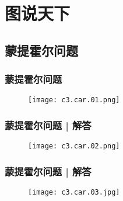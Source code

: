 \section{图说天下}
\subsection{蒙提霍尔问题}
\begin{frame}
  \frametitle{蒙提霍尔问题}
  \begin{figure}
    \centering
    \texttt{[image: c3.car.01.png]}
  \end{figure}
\end{frame}

\begin{frame}
  \frametitle{蒙提霍尔问题 | 解答}
  \begin{figure}
    \centering
    \texttt{[image: c3.car.02.png]}
  \end{figure}
\end{frame}
\begin{frame}
  \frametitle{蒙提霍尔问题 | 解答}
  \begin{figure}
    \centering
    \texttt{[image: c3.car.03.jpg]}
  \end{figure}
\end{frame}


